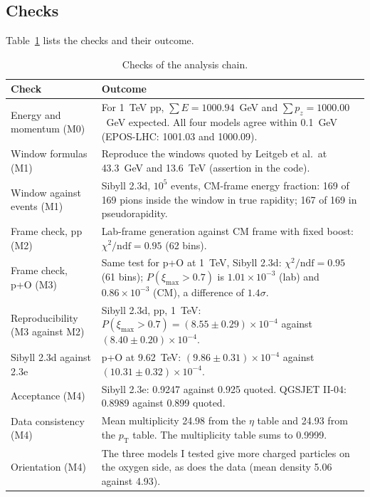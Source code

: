 \documentclass[11pt,a4paper]{article}
\newcommand{\pT}{\ensuremath{p_{\mathrm{T}}}}
\newcommand{\Pmax}{\ensuremath{P(\xi_{\max}>0.7)}}
\begin{document}
\subsection{Checks}
Table~\ref{tab:checks} lists the checks and their outcome.

\begin{table}[!htbp]
\centering
\small
\caption{Checks of the analysis chain.}
\label{tab:checks}
\begin{tabular}{@{}p{4.1cm}p{9.3cm}@{}}
\toprule
Check & Outcome\\
\midrule
Energy and momentum (M0) & For 1~TeV pp, $\sum E=1000.94$~GeV and $\sum p_z=1000.00$~GeV expected. All four models agree within 0.1~GeV (EPOS-LHC: 1001.03 and 1000.09).\\
Window formulas (M1) & Reproduce the windows quoted by Leitgeb et al.\ at 43.3~GeV and 13.6~TeV (assertion in the code).\\
Window against events (M1) & Sibyll 2.3d, $10^{5}$ events, CM-frame energy fraction: 169 of 169 pions inside the window in true rapidity; 167 of 169 in pseudorapidity.\\
Frame check, pp (M2) & Lab-frame generation against CM frame with fixed boost: $\chi^{2}/\mathrm{ndf}=0.95$ (62 bins).\\
Frame check, p+O (M3) & Same test for p+O at 1~TeV, Sibyll 2.3d: $\chi^{2}/\mathrm{ndf}=0.95$ (61 bins); $\Pmax$ is $1.01\times10^{-3}$ (lab) and $0.86\times10^{-3}$ (CM), a difference of $1.4\sigma$.\\
Reproducibility (M3 against M2) & Sibyll 2.3d, pp, 1~TeV: $\Pmax=(8.55\pm0.29)\times10^{-4}$ against $(8.40\pm0.20)\times10^{-4}$.\\
Sibyll 2.3d against 2.3e & p+O at 9.62~TeV: $(9.86\pm0.31)\times10^{-4}$ against $(10.31\pm0.32)\times10^{-4}$.\\
Acceptance (M4) & Sibyll 2.3e: 0.9247 against 0.925 quoted. QGSJET II-04: 0.8989 against 0.899 quoted.\\
Data consistency (M4) & Mean multiplicity 24.98 from the $\eta$ table and 24.93 from the $\pT$ table. The multiplicity table sums to 0.9999.\\
Orientation (M4) & The three models I tested give more charged particles on the oxygen side, as does the data (mean density 5.06 against 4.93).\\
\bottomrule
\end{tabular}
\end{table}

\end{document}
